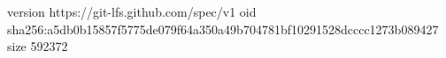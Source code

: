 version https://git-lfs.github.com/spec/v1
oid sha256:a5db0b15857f5775de079f64a350a49b704781bf10291528dcccc1273b089427
size 592372
